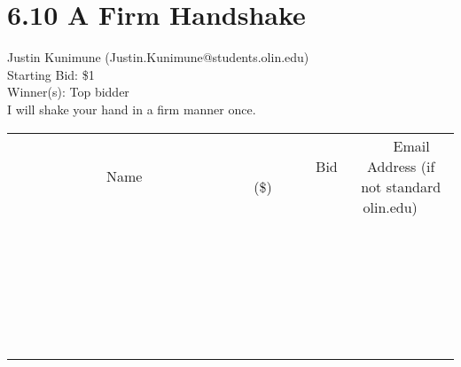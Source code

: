 \documentclass[11pt]{article}
\begin{document}
\section*{6.10 A Firm Handshake}
Justin Kunimune (Justin.Kunimune@students.olin.edu) \\
Starting Bid: \$1 \\
Winner(s): 
Top bidder \\
I will shake your hand in a firm manner once. \\[6ex]
\begin{tabular}{c c c}
~~~~~~~~~~~~~Name~~~~~~~~~~~~~ & ~~~~~~~~~Bid (\$)~~~~~~~~~ & ~~~Email Address (if not standard olin.edu)~~~ \\
 & & \\
\hline
 & & \\
\hline
 & & \\
\hline
 & & \\
\hline
 & & \\
\hline
 & & \\
\hline
 & & \\
\hline
 & & \\
\hline
 & & \\
\hline
 & & \\
\hline
 & & \\
\hline
 & & \\
\hline
 & & \\
\hline
 & & \\
\hline
 & & \\
\hline
 & & \\
\hline
 & & \\
\hline
 & & \\
\hline
 & & \\
\hline
 & & \\
\hline
 & & \\
\hline
 & & \\
\hline
 & & \\
\hline
 & & \\
\hline
 & & \\
\hline
 & & \\
\hline
\end{tabular}
\clearpage
\end{document}
